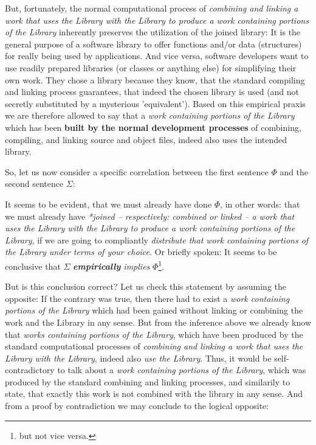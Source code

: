 But, fortunately, the normal computational process of \emph{combining and
linking a work that uses the Library with the Library to produce a work
containing portions of the Library} inherently preserves the utilization of the
joined library: It is the general purpose of a software library to offer
functions and/or data (structures) for really being used by applications. And
vice versa, software developers want to use readily prepared libraries (or
classes or anything else) for simplifying their own work. They chose a library
because they know, that the standard compiling and linking process guarantees,
that indeed the chosen library is used (and not secretly substituted by a
mysterious 'equivalent'). Based on this empirical praxis we are therefore
allowed to say that a \emph{work containing portions of the Library} which has
been \textbf{built by the normal development processes} of combining, compiling,
and linking source and object files, indeed also uses the intended library.

So, let us now consider a specific correlation between the first sentence
$\Phi$ and the second sentence $\Sigma$:

It seems to be evident, that we must already have done $\Phi$, in other words:
that we must already have \emph{*joined -- respectively: combined or linked -- a
work that uses the Library with the Library to produce a work containing
portions of the Library}, if we are going to compliantly \emph{distribute that
work containing portions of the Library under terms of your choice}. Or briefly
spoken: It seems to be conclusive that $\Sigma$ \emph{\textbf{empirically}
implies} $\Phi$\footnote{but not vice versa.}.

But is this conclusion correct? Let us check this statement by assuming the
opposite: If the contrary was true, then there had to exist a \emph{work
containing portions of the Library} which had been gained without linking or
combining the work and the Library in any sense. But from the inference above we
already know that \emph{works containing portions of the Library}, which have
been produced by the standard computational processes of \emph{combining and
linking a work that uses the Library with the Library}, indeed also \emph{use
the Library}. Thus, it would be self-contradictory to talk about a \emph{work
containing portions of the Library}, which was produced by the standard
combining and linking processes, and similarily to state, that exactly this work
is not combined with the library in any sense. And from a proof by contradiction
we may conclude to the logical opposite:

